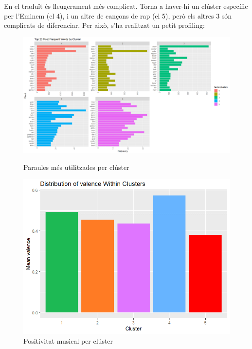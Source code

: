 En el traduït és lleugerament més complicat. Torna a haver-hi un clúster específic per l'Eminem (el 4), i un altre de cançons de rap (el 5), però els altres 3 són complicats de diferenciar. Per això, s'ha realitzat un petit profiling:

\begin{figure}[H]
    \centering
    \begin{minipage}{.4\textwidth}
        \centering
        \includegraphics[width=1\linewidth]{Images//8_Textual//LSA/profiling_words_cluster.png}
        \caption{Paraules més utilitzades per clúster}
        \label{fig:textual_lsa_profiling_words}
    \end{minipage}%
    \begin{minipage}{.4\textwidth}
        \centering
        \includegraphics[width=0.95\linewidth]{Images//8_Textual//LSA/profiling_valence.png}
        \caption{Positivitat musical per clúster}
        \label{fig:textual_lsa_profiling_val}
    \end{minipage}%
\end{figure}

